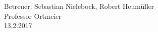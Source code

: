 \begin{center}
{\large 
Betreuer: Sebastian Nielebock, Robert Heumüller\\
Professor Ortmeier\\
13.2.2017}
\end{center}

\newpage